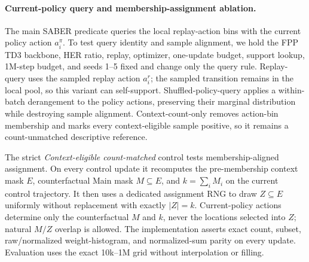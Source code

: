 \documentclass[letterpaper]{article}
\begin{document}
\paragraph{Current-policy query and membership-assignment ablation.}
The main SABER predicate queries the local replay-action bins with the current policy action \(a_i^\pi\). To test query identity and sample alignment, we hold the FPP TD3 backbone, HER ratio, replay, optimizer, one-update budget, support lookup, 1M-step budget, and seeds 1--5 fixed and change only the query rule. Replay-query uses the sampled replay action \(a_i^r\); the sampled transition remains in the local pool, so this variant can self-support. Shuffled-policy-query applies a within-batch derangement to the policy actions, preserving their marginal distribution while destroying sample alignment. Context-count-only removes action-bin membership and marks every context-eligible sample positive, so it remains a count-unmatched descriptive reference.

The strict \emph{Context-eligible count-matched} control tests membership-aligned assignment. On every control update it recomputes the pre-membership context mask \(E\), counterfactual Main mask \(M\subseteq E\), and \(k=\sum_i M_i\) on the current control trajectory. It then uses a dedicated assignment RNG to draw \(Z\subseteq E\) uniformly without replacement with exactly \(|Z|=k\). Current-policy actions determine only the counterfactual \(M\) and \(k\), never the locations selected into \(Z\); natural \(M/Z\) overlap is allowed. The implementation asserts exact count, subset, raw/normalized weight-histogram, and normalized-sum parity on every update. Evaluation uses the exact 10k--1M grid without interpolation or filling.
\end{document}
